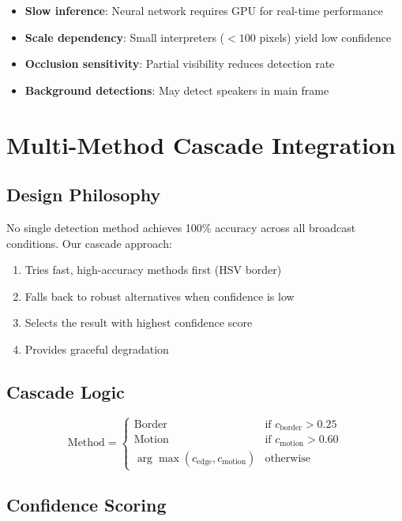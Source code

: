 \documentclass[11pt,a4paper]{article}
\begin{document}
\begin{itemize}
    \item \textbf{Slow inference}: Neural network requires GPU for real-time performance
    \item \textbf{Scale dependency}: Small interpreters ($<100$ pixels) yield low confidence
    \item \textbf{Occlusion sensitivity}: Partial visibility reduces detection rate
    \item \textbf{Background detections}: May detect speakers in main frame
\end{itemize}

\section{Multi-Method Cascade Integration}

\subsection{Design Philosophy}

No single detection method achieves 100\% accuracy across all broadcast conditions. Our cascade approach:

\begin{enumerate}
    \item Tries fast, high-accuracy methods first (HSV border)
    \item Falls back to robust alternatives when confidence is low
    \item Selects the result with highest confidence score
    \item Provides graceful degradation
\end{enumerate}

\subsection{Cascade Logic}

\begin{equation}
\text{Method} = \begin{cases} 
\text{Border} & \text{if } c_{\text{border}} > 0.25 \\
\text{Motion} & \text{if } c_{\text{motion}} > 0.60 \\
\arg\max(c_{\text{edge}}, c_{\text{motion}}) & \text{otherwise}
\end{cases}
\end{equation}

\subsection{Confidence Scoring}
\end{document}
